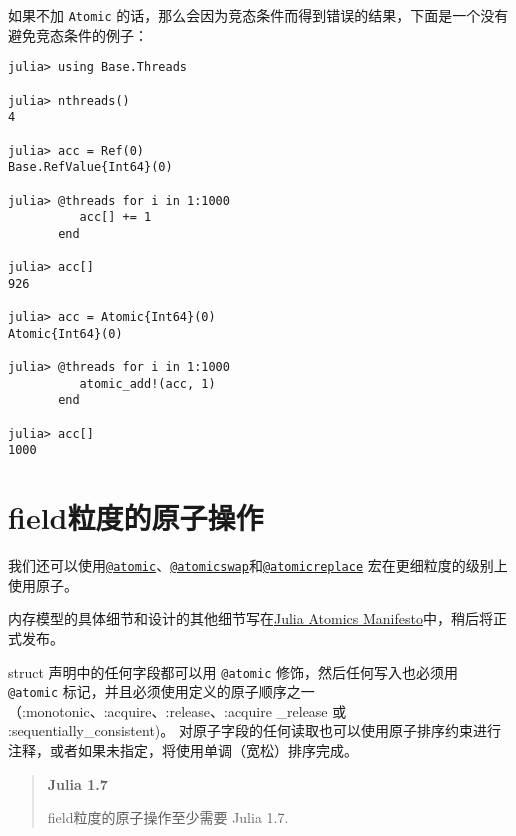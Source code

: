 如果不加 \texttt{Atomic} 的话，那么会因为竞态条件而得到错误的结果，下面是一个没有避免竞态条件的例子：




\begin{verbatim}
julia> using Base.Threads

julia> nthreads()
4

julia> acc = Ref(0)
Base.RefValue{Int64}(0)

julia> @threads for i in 1:1000
          acc[] += 1
       end

julia> acc[]
926

julia> acc = Atomic{Int64}(0)
Atomic{Int64}(0)

julia> @threads for i in 1:1000
          atomic_add!(acc, 1)
       end

julia> acc[]
1000
\end{verbatim}



\hypertarget{12362166886003697681}{}


\section{field粒度的原子操作}



我们还可以使用\href{@ref Base.@atomic}{\texttt{@atomic}}、\href{@ref Base.@atomicswap}{\texttt{@atomicswap}}和\href{@ref Base.@atomicreplace}{\texttt{@atomicreplace}} 宏在更细粒度的级别上使用原子。



内存模型的具体细节和设计的其他细节写在\href{https://gist.github.com/vtjnash/11b0031f2e2a66c9c24d33e810b34ec0}{Julia Atomics Manifesto}中，稍后将正式发布。



struct 声明中的任何字段都可以用 \texttt{@atomic} 修饰，然后任何写入也必须用 \texttt{@atomic} 标记，并且必须使用定义的原子顺序之一（:monotonic、:acquire、:release、:acquire \_release 或 :sequentially\_consistent)。 对原子字段的任何读取也可以使用原子排序约束进行注释，或者如果未指定，将使用单调（宽松）排序完成。



\begin{quote}
\textbf{Julia 1.7}

field粒度的原子操作至少需要 Julia 1.7.

\end{quote}


\hypertarget{7991639019614529846}{}


